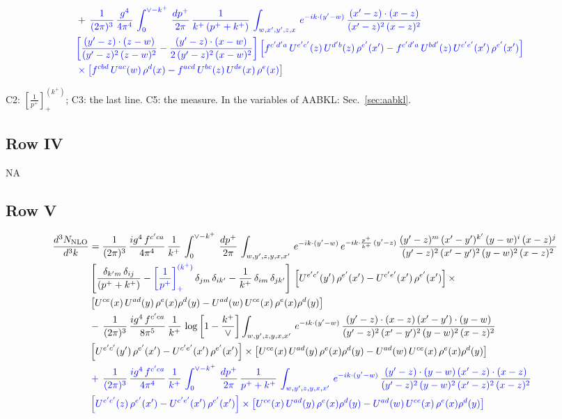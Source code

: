 \documentclass[9pt]{article}
\newcommand{\new}[1]{{\color{blue}#1}}
\newcommand{\nc}{\color{blue}}
\numberwithin{equation}{section}
\begin{document}
\begin{align}
\notag \\ & \nc +\,\frac{1}{(2\pi)^{3}}\,\frac{g^{4}}{4\pi^{4}}\,\int_{0}^{\vee-k^{+}}\, \frac{dp^{+}}{2\pi}\,\frac{1}{k^{+}\,(p^{+}+k^{+})}\,\int_{w,x',y',z,x}\, e^{-ik\cdot (y'-w)}\,\frac{(x'-z)\cdot (x-z)}{(x'-z)^{2}\,(x-z)^{2}}\notag \\ & \nc \bigg[\frac{(y'-z)\cdot (z-w)}{(y'-z)^{2}\,(z-w)^{2}}-\frac{(y'-z)\cdot (x-w)}{2\,(y'-z)^{2}\,(x-w)^{2}}\bigg]\left[f^{c'd'a}\,U^{e'c'}(z)\,U^{d'b}(z)\,\rho^{e'}(x')-f^{c'd'a}\, U^{bd'}(z)\,U^{c'e'}(x')\,\rho^{e'}(x')\right]\notag \\ & \nc \times\left[f^{cbd}\,U^{ac}(w)\,\rho^{d}(x) -f^{acd}\,U^{bc}(z)\,U^{de}(x)\,\rho^{e}(x)\right]
\end{align}

\new{C2: $\left[\frac{1}{p^+}\right]_+^{(k^+)}$; C3: the last line. C5: the measure. In the variables of AABKL: Sec.~\ref{sec:aabkl}.}
\subsection{Row IV}
\textsc{NA}
\subsection{Row V}
\begin{align}
    \frac{d^{3}N_{\rm NLO}}{d^{3}k} & = \frac{1}{(2\pi)^{3}}\, \frac{ig^{4}\,f^{c'ca}}{4\pi^{4}}\, \frac{1}{k^{+}}\,\int_{0}^{\vee-k^{+}}\, \frac{dp^{+}}{2\pi}\, \int_{w,y',z,y,x,x'}\, e^{-ik\cdot (y'-w)}\, e^{-ik\cdot \frac{p^{+}}{k^{+}}\,(y'-z)}\,\frac{(y'-z)^{m}\,(x'-y')^{k'}\,(y-w)^{i}\,(x-z)^{j}}{(y'-z)^{2}\,(x'-y')^{2}\,(y-w)^{2}\,(x-z)^{2}}\notag \\ & \left[\frac{\delta_{k'm}\,\delta_{ij}}{(p^{+}+k^{+})}-\new{\left[\frac{1}{p^{+}}\right]_{+}^{(k^{+})}}\,\delta_{jm}\,\delta_{ik'}-\frac{1}{k^{+}}\, \delta_{im}\, \delta_{jk'}\right]\, \left[U^{e'c'}(y')\,\rho^{e'}(x')-U^{c'e'}(x')\,\rho^{e'}(x')\right]\times \notag \\ &  \left[U^{ce}(x)\,U^{ad}(y)\,\rho^{e}(x)\rho^{d}(y)-U^{ad}(w)\,U^{ce}(x)\,\rho^{e}(x)\rho^{d}(y)\right]\notag \\ & -\,\frac{1}{(2\pi)^{3}}\, \frac{ig^{4}\,f^{c'ca}}{8\pi^{5}}\, \frac{1}{k^{+}}\, \log{\left[1-\frac{k^{+}}{\vee}\right]} \int_{w,y',z,y,x,x'}\, e^{-ik\cdot (y'-w)}\,\frac{(y'-z)\cdot (x-z)\,(x'-y')\cdot (y-w)}{(y'-z)^{2}\,(x'-y')^{2}\,(y-w)^{2}\,(x-z)^{2}}\notag \\ & \left[U^{e'c'}(y')\,\rho^{e'}(x')-U^{c'e'}(x')\,\rho^{e'}(x')\right]\times  \left[U^{ce}(x)\,U^{ad}(y)\,\rho^{e}(x)\rho^{d}(y)-U^{ad}(w)\,U^{ce}(x)\,\rho^{e}(x)\rho^{d}(y)\right]
\notag \\ & \nc +\,\frac{1}{(2\pi)^{3}}\, \frac{ig^{4}\,f^{c'ca}}{4\pi^{4}}\, \frac{1}{k^{+}}\,\int_{0}^{\vee-k^{+}}\, \frac{dp^{+}}{2\pi}\,\frac{1}{p^{+}+k^{+}}\, \int_{w,y',z,y,x,x'}\, e^{-ik\cdot (y'-w)}\,\frac{(y'-z)\cdot (y-w)\,(x'-z)\cdot (x-z)}{(y'-z)^{2}\,(y-w)^{2}\,(x'-z)^{2}\,(x-z)^{2}}\notag \\ & \nc \left[U^{e'c'}(z)\,\rho^{e'}(x')-U^{c'e'}(x')\,\rho^{e'}(x')\right]\times\left[U^{ce}(x)\,U^{ad}(y)\,\rho^{e}(x)\rho^{d}(y)-U^{ad}(w)\,U^{ce}(x)\,\rho^{e}(x)\rho^{d}(y)\right]
\end{align}
\end{document}
